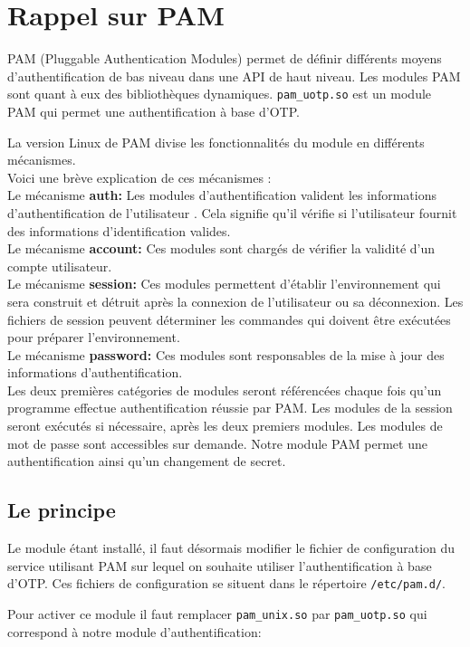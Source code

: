 \documentclass{"../../../res/univ-projet"}
\begin{document}
\section{Rappel sur PAM}
PAM (Pluggable Authentication Modules) permet de définir différents moyens
d'authentification de bas niveau dans une API de haut niveau.
Les modules PAM sont quant à eux des bibliothèques dynamiques. \verb?pam_uotp.so?
est un module PAM qui permet une authentification à base d'OTP.

La version Linux de PAM divise les fonctionnalités du module en différents mécanismes.\\
Voici une brève explication de ces mécanismes :\\
Le mécanisme \textbf{auth:} Les modules d'authentification valident les informations d'authentification de l'utilisateur . Cela signifie qu'il vérifie si l'utilisateur fournit des informations d'identification valides.\\
Le mécanisme \textbf{account:} Ces modules sont chargés de vérifier la validité d'un compte utilisateur.\\
Le mécanisme \textbf{session:} Ces modules permettent d'établir l'environnement qui sera construit et détruit après la connexion de l'utilisateur ou sa déconnexion. Les fichiers de session peuvent déterminer les commandes qui doivent être exécutées pour préparer l'environnement.\\
Le mécanisme \textbf{password:} Ces modules sont responsables de la mise à jour des informations d'authentification.\\
Les deux premières catégories de modules seront référencées chaque fois qu'un programme effectue authentification réussie par PAM.
Les modules de la session seront exécutés si nécessaire, après les deux premiers modules. Les modules de mot de passe sont accessibles sur demande. Notre module PAM permet une authentification ainsi qu'un changement de secret.

\subsection{Le principe}
Le module étant installé, il faut désormais modifier le fichier de 
configuration du service utilisant PAM sur lequel on souhaite utiliser 
l'authentification à base d'OTP. Ces fichiers de configuration se situent 
dans le répertoire \verb?/etc/pam.d/?.

Pour activer ce module il faut remplacer \verb?pam_unix.so? par \verb?pam_uotp.so?  
qui correspond à notre module d'authentification:
\end{document}
